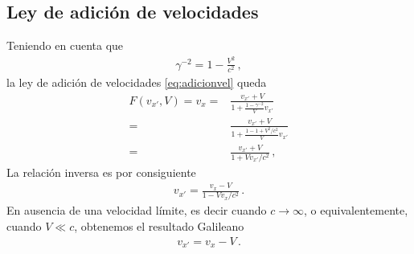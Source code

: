 \subsection{Ley de adición de velocidades}
Teniendo en cuenta que
\begin{align*}
  \gamma^{-2}=1-\frac{V^2}{c^2}\,,
\end{align*}
la ley de adición de velocidades \eqref{eq:adicionvel} queda
\begin{align*}
  F(v_{x'},V)=v_{x}=&\frac{v_{x'}+V}{1+\frac{1-\gamma^{-2}}{V}v_{x'}}\nonumber\\
  =&\frac{v_{x'}+V}{1+\frac{1-1+V^2/c^2}{V}v_{x'}}\nonumber\\
  =&\frac{v_{x'}+V}{1+{Vv_{x'}}/{c^2}}\,,
\end{align*}
La relación inversa es por consiguiente
\begin{align}
  \label{eq:addvel}
v_{x'}=\frac{v_x-V}{1-V v_x/c^2}\,.
\end{align}
En ausencia de una velocidad límite, es decir cuando $c\to \infty$, o equivalentemente, cuando $V\ll c$, obtenemos el resultado Galileano
\begin{align}
  \label{eq:galsumavel}
  v_{x'}=v_x-V\,.
\end{align}


